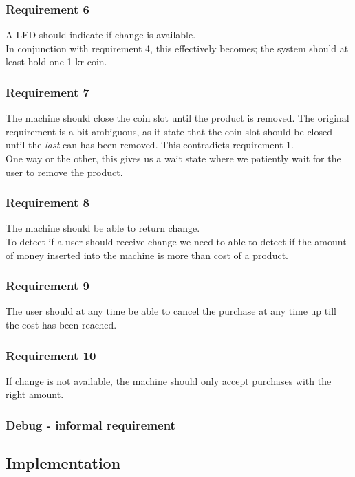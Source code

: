 \subsubsection*{Requirement 6}
A LED should indicate if change is available.\\
In conjunction with requirement 4, this effectively becomes; the system should at least hold one 1 kr coin. 

\subsubsection*{Requirement 7}
The machine should close the coin slot until the product is removed. The original requirement is a bit ambiguous, as it state that the coin slot should be closed until the \emph{last} can has been removed. This contradicts requirement 1.\\
One way or the other, this gives us a wait state where we patiently wait for the user to remove the product.

\subsubsection*{Requirement 8}
The machine should be able to return change.\\
To detect if a user should receive change we need to able to detect if the amount of money inserted into the machine is more than cost of a product.

\subsubsection*{Requirement 9}
The user should at any time be able to cancel the purchase at any time up till the cost has been reached.\\


\subsubsection*{Requirement 10}
If change is not available, the machine should only accept purchases with the right amount.\\

\subsubsection*{Debug - informal requirement}
\label{sec:debug}

\subsection{Implementation}


